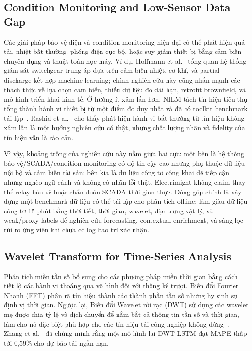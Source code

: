 \documentclass[conference]{IEEEtran}
\begin{document}
\subsection{Condition Monitoring and Low-Sensor Data Gap}

Các giải pháp bảo vệ điện và condition monitoring hiện đại có thể phát hiện quá tải, nhiệt bất thường, phóng điện cục bộ, hoặc suy giảm thiết bị bằng cảm biến chuyên dụng và thuật toán học máy. Ví dụ, Hoffmann et al.~\cite{hoffmann2020switchgear} tổng quan hệ thống giám sát switchgear trung áp dựa trên cảm biến nhiệt, cơ khí, và partial discharge kết hợp machine learning; chính nghiên cứu này cũng nhấn mạnh các thách thức về lựa chọn cảm biến, thiếu dữ liệu đo dài hạn, retrofit brownfield, và mô hình triển khai kinh tế. Ở hướng ít xâm lấn hơn, NILM tách tín hiệu tiêu thụ tổng thành hành vi thiết bị từ một điểm đo duy nhất và đã có toolkit benchmark tái lập~\cite{batra2014nilmtk}. Rashid et al.~\cite{rashid2019nilm} cho thấy phát hiện hành vi bất thường từ tín hiệu không xâm lấn là một hướng nghiên cứu có thật, nhưng chất lượng nhãn và fidelity của tín hiệu vẫn là rào cản.

Vì vậy, khoảng trống của nghiên cứu này nằm giữa hai cực: một bên là hệ thống bảo vệ/SCADA/condition monitoring có độ tin cậy cao nhưng phụ thuộc dữ liệu nội bộ và cảm biến tài sản; bên kia là dữ liệu công tơ công khai dễ tiếp cận nhưng nghèo ngữ cảnh và không có nhãn lỗi thật. Electrimight không claim thay thế relay bảo vệ hoặc chẩn đoán SCADA thời gian thực. Đóng góp chính là xây dựng một benchmark dữ liệu có thể tái lập cho phân tích offline: làm giàu dữ liệu công tơ 15 phút bằng thời tiết, thời gian, wavelet, đặc trưng vật lý, và weak/proxy labels để nghiên cứu forecasting, contextual enrichment, và sàng lọc rủi ro ứng viên khi chưa có log bảo trì xác nhận.

\subsection{Wavelet Transform for Time-Series Analysis}

Phân tích miền tần số bổ sung cho các phương pháp miền thời gian bằng cách tiết lộ các hành vi thoáng qua vô hình đối với thống kê trượt. Biến đổi Fourier Nhanh (FFT) phân rã tín hiệu thành các thành phần tần số nhưng hy sinh sự định vị thời gian. Ngược lại, Biến đổi Wavelet rời rạc (DWT) sử dụng các wavelet mẹ được chia tỷ lệ và dịch chuyển để nắm bắt cả thông tin tần số và thời gian, làm cho nó đặc biệt phù hợp cho các tín hiệu tải công nghiệp không dừng~\cite{mallat1989}. Zhang et al.~\cite{zhang2024} đã chứng minh rằng một mô hình lai DWT-LSTM đạt MAPE thấp tới 0,59\% cho dự báo tải ngắn hạn.
\end{document}
